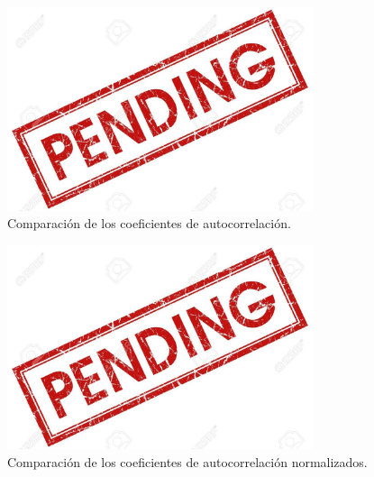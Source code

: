 \begin{figure}[H]
\centering
	\includegraphics[width=0.8\textwidth, trim = {0 0 0 0},clip]{./Imagenes/pend.jpg}
	\caption{Comparación de los coeficientes de autocorrelación.}
	\label{fig:Rxxcalc}
\end{figure}
\begin{figure}[H]
\centering
	\includegraphics[width=0.8\textwidth, trim = {0 0 0 0},clip]{./Imagenes/pend.jpg}
	\caption{Comparación de los coeficientes de autocorrelación normalizados.}
	\label{fig:rrxxcalc2}
\end{figure}

